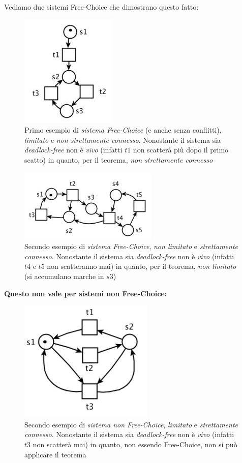 \documentclass[a4paper,12pt, oneside]{book}
\begin{document}
\begin{esempio}
  Vediamo due sistemi Free-Choice che dimostrano questo fatto:\\
  \begin{figure}[H]
    \centering
    \includegraphics[scale = 0.55]{img/fc6.jpg}
    \caption{Primo esempio di \emph{sistema Free-Choice} (e anche senza
      conflitti), \emph{limitato} e \emph{non strettamente
        connesso}. Nonostante il sistema sia \emph{deadlock-free} non è
      \emph{vivo} (infatti $t1$ non scatterà più dopo il primo scatto) in
      quanto, per il teorema, \emph{non strettamente connesso}} 
  \end{figure}
  \begin{figure}[H]
    \centering
    \includegraphics[scale = 0.65]{img/fc7.jpg}
    \caption{Secondo esempio di \emph{sistema Free-Choice}, \emph{non limitato}
      e \emph{strettamente connesso}. Nonostante il sistema sia
      \emph{deadlock-free} non è \emph{vivo} (infatti $t4$ e $t5$ non
      scatteranno mai) in quanto, per il teorema, \emph{non limitato} (si
      accumulano marche in $s3$)}  
  \end{figure}
  \textbf{ Questo non vale per sistemi non Free-Choice:}
  \begin{figure}[H]
    \centering
    \includegraphics[scale = 0.5]{img/fc3.jpg}
    \caption{Secondo esempio di \emph{sistema non Free-Choice}, \emph{limitato}
      e \emph{strettamente connesso}. Nonostante il sistema sia
      \emph{deadlock-free} non è \emph{vivo} (infatti $t3$ non scatterà mai) in
      quanto, non essendo Free-Choice, non si può applicare il teorema} 
  \end{figure}
\end{esempio}
\end{document}
